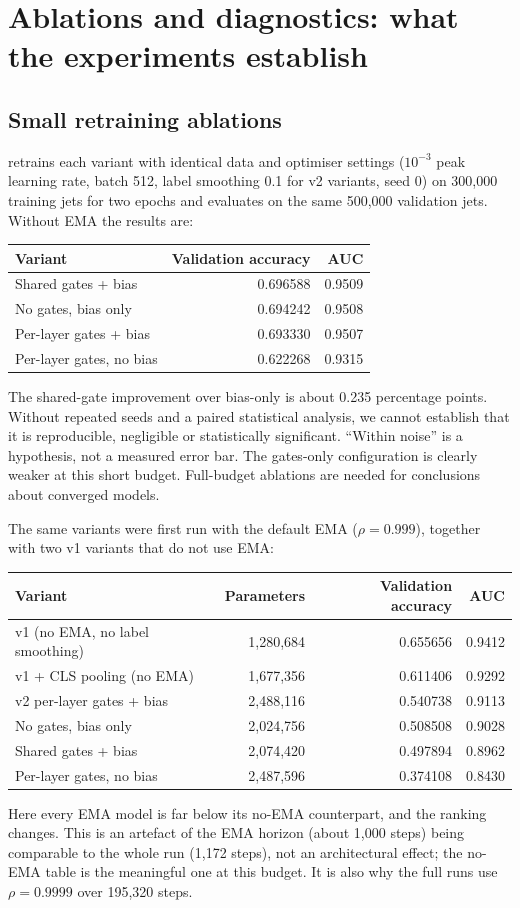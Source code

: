 \documentclass[11pt,a4paper]{article}
\newcommand{\code}[1]{\texttt{\small\detokenize{#1}}}
\numberwithin{equation}{section}
\begin{document}
\section{Ablations and diagnostics: what the experiments establish}\label{sec:exp}
\subsection{Small retraining ablations}
\code{run_ablations.py} retrains each variant with identical data and optimiser settings
($10^{-3}$ peak learning rate, batch 512, label smoothing 0.1 for v2 variants, seed 0) on
300,000 training jets for two epochs and evaluates on the same 500,000 validation jets.
Without EMA the results are:
\begin{center}
\begin{tabular}{lrr}
\toprule Variant & Validation accuracy & AUC\\ \midrule
Shared gates + bias & 0.696588 & 0.9509\\
No gates, bias only & 0.694242 & 0.9508\\
Per-layer gates + bias & 0.693330 & 0.9507\\
Per-layer gates, no bias & 0.622268 & 0.9315\\
\bottomrule
\end{tabular}
\end{center}
The shared-gate improvement over bias-only is about 0.235 percentage
points. Without repeated seeds and a paired statistical analysis, we
cannot establish that it is reproducible, negligible or statistically
significant. ``Within noise'' is a hypothesis, not a measured error bar.
The gates-only configuration is clearly weaker at this short budget.
Full-budget ablations are needed for conclusions about converged models.

The same variants were first run with the default EMA ($\rho=0.999$), together with two v1
variants that do not use EMA:
\begin{center}
\begin{tabular}{lrrr}
\toprule Variant & Parameters & Validation accuracy & AUC\\ \midrule
v1 (no EMA, no label smoothing) & 1,280,684 & 0.655656 & 0.9412\\
v1 + CLS pooling (no EMA) & 1,677,356 & 0.611406 & 0.9292\\
v2 per-layer gates + bias & 2,488,116 & 0.540738 & 0.9113\\
No gates, bias only & 2,024,756 & 0.508508 & 0.9028\\
Shared gates + bias & 2,074,420 & 0.497894 & 0.8962\\
Per-layer gates, no bias & 2,487,596 & 0.374108 & 0.8430\\
\bottomrule
\end{tabular}
\end{center}
Here every EMA model is far below its no-EMA counterpart, and the ranking changes. This is an
artefact of the EMA horizon (about 1,000 steps) being comparable to the whole run (1,172 steps),
not an architectural effect; the no-EMA table is the meaningful one at this budget. It is also why
the full runs use $\rho=0.9999$ over 195,320 steps.
\end{document}
